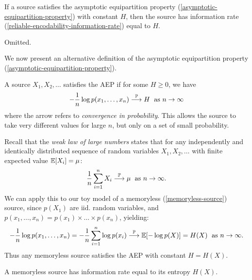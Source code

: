 \documentclass{article}
\begin{document}
\begin{theorem}
    If a source satisfies the asymptotic equipartition property (\ref{asymptotic-equipartition-property}) with constant $H$, then the source has information rate (\ref{reliable-encodability-information-rate}) equal to $H$.
\end{theorem}
\begin{prf}
    Omitted.
\end{prf}

We now present an alternative definition of the asymptotic equipartition property (\ref{asymptotic-equipartition-property}).

\begin{definition}
    A source $X_1, X_2, \dots$ satisfies the AEP if for some $H \geq 0$, we have
    \[
	- \frac{1}{n} \log p(x_1, \dots, x_n) \stackrel{\mathbb{P}}{\longrightarrow} H \; \text{ as $n \to \infty$}
	\]
	where the arrow refers to \textit{convergence in probability}. This allows the source to take very different values for large $n$, but only on a set of small probability.
\end{definition}

\begin{remark}
    Recall that the \textit{weak law of large numbers} states that for any independently and identically distributed sequence of random variables $X_1, X_2, \dots$ with finite expected value $\mathbb{E}[X_i] = \mu$:
    \[
	\frac{1}{n} \sum_{i=1}^n X_i \stackrel{\mathbb{P}}{\longrightarrow} \mu \; \text{ as $n \to \infty$}.
	\]
	We can apply this to our toy model of a memoryless (\ref{memoryless-source}) source, since $p(X_1)$ are iid. random variables, and $p(x_1, \dots, x_n) = p(x_1) \times \dots \times p(x_n)$, yielding:
	\[
	- \frac{1}{n} \log p(x_1, \dots, x_n) = -\frac{1}{n} \sum_{i=1}^n \log p(x_i) \stackrel{\mathbb{P}}{\longrightarrow} \mathbb{E}[-\log p(X)] = H(X) \; \text{ as $n \to \infty$}.
	\]
	Thus any memoryless source satisfies the AEP with constant $H = H(X)$.
\end{remark}

\begin{corollary}
    A memoryless source has information rate equal to its entropy $H(X)$.
\end{corollary}
\end{document}
